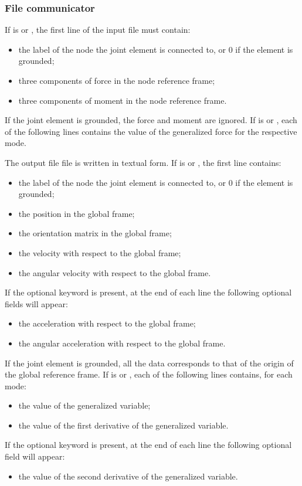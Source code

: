 \subsubsection{File communicator}
If  is  or , the first line of the input file
must contain:
\begin{itemize}
\item the label of the  node the  joint element
	is connected to, or 0 if the element is grounded;
\item three components of force in the  node reference frame;
\item three components of moment in the  node reference frame.
\end{itemize}
If the  joint element is grounded, the force and moment
are ignored.
If  is  or ,
each of the following lines contains the value of the generalized force
for the respective mode.

The output file file is written in textual form.
If  is  or , the first line contains:
\begin{itemize}
\item the label of the  node the  joint element
	is connected to, or 0 if the element is grounded;
\item the position in the global frame;
\item the orientation matrix in the global frame;
\item the velocity with respect to the global frame;
\item the angular velocity with respect to the global frame.
\end{itemize}
If the optional keyword  is present,
at the end of each line the following optional fields will appear:
\begin{itemize}
\item the acceleration with respect to the global frame;
\item the angular acceleration with respect to the global frame.
\end{itemize}
If the  joint element is grounded, all the data corresponds
to that of the origin of the global reference frame.
If  is  or , each of the following lines contains,
for each mode:
\begin{itemize}
\item the value of the generalized variable;
\item the value of the first derivative of the generalized variable.
\end{itemize}
If the optional keyword  is present,
at the end of each line the following optional field will appear:
\begin{itemize}
\item the value of the second derivative of the generalized variable.
\end{itemize}



